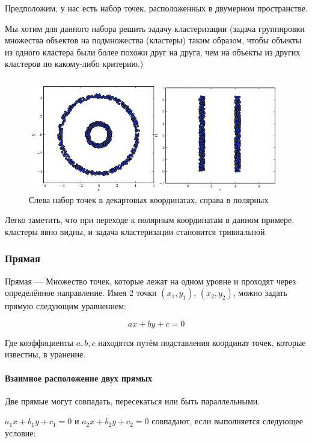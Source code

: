 Предположим, у нас есть набор точек, расположенных в двумерном пространстве. \newline
\par Мы хотим для данного набора решить задачу кластеризации (задача группировки множества объектов на подмножества (кластеры) таким образом, чтобы объекты из одного кластера были более похожи друг на друга, чем на объекты из других кластеров по какому-либо критерию.)

\begin{figure}[H]
    \centering
    \includegraphics[width = 12cm]{Clusters.png}
    \caption{Слева набор точек в декартовых координатах, справа в полярных}
    \label{fig:float}
\end{figure}

Легко заметить, что при переходе к полярным координатам в данном примере, кластеры явно видны, и задача кластеризации становится тривиальной.

\subsubsection{Прямая}

Прямая — Множество точек, которые лежат на одном уровне и проходят через определённое направление. Имея 2 точки $(x_1, y_1)$, $(x_2, y_2)$, можно задать прямую следующим уравнением:

\[
    ax + by + c = 0
\]

Где коэффициенты $a,b,c$ находятся путём подставления координат точек, которые известны, в уранение.

\paragraph*{Взаимное расположение двух прямых}
Две прямые могут совпадать, пересекаться или быть параллельными.

\( a_1x + b_1y + c_1 = 0 \) и \( a_2x + b_2y + c_2 = 0 \) совпадают, если выполняется следующее условие:

